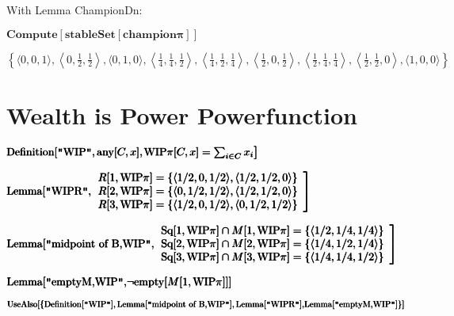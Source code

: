 \documentclass{article}
\begin{document}
With Lemma ChampionDn:

\noindent\(\pmb{\text{Compute}[\text{stableSet}[\text{champion$\pi $}]]}\)

\noindent\(\left\{\langle 0,0,1\rangle ,\left\langle 0,\frac{1}{2},\frac{1}{2}\right\rangle ,\langle 0,1,0\rangle ,\left\langle \frac{1}{4},\frac{1}{4},\frac{1}{2}\right\rangle
,\left\langle \frac{1}{4},\frac{1}{2},\frac{1}{4}\right\rangle ,\left\langle \frac{1}{2},0,\frac{1}{2}\right\rangle ,\left\langle \frac{1}{2},\frac{1}{4},\frac{1}{4}\right\rangle
,\left\langle \frac{1}{2},\frac{1}{2},0\right\rangle ,\langle 1,0,0\rangle \right\}\)

\section*{Wealth is Power Powerfunction}

\noindent\(\pmb{\text{Definition}[\text{$\texttt{"}$WIP$\texttt{"}$},\text{any}[C,x],}\\
\pmb{\left.\text{WIP$\pi $}[C,x]= \sum _{i\in C} x_i\right]}\)

\noindent\(\pmb{\text{Lemma}[\text{$\texttt{"}$WIPR$\texttt{"}$},}\\
\pmb{\left.
\begin{array}{c}
 R[1,\text{WIP$\pi $}]=\{\langle 1/2,0,1/2\rangle ,\langle 1/2,1/2,0\rangle \} \\
 R[2,\text{WIP$\pi $}]=\{\langle 0,1/2,1/2\rangle ,\langle 1/2,1/2,0\rangle \} \\
 R[3,\text{WIP$\pi $}]=\{\langle 1/2,0,1/2\rangle ,\langle 0,1/2,1/2\rangle \}
\end{array}
\right]}\)

\noindent\(\pmb{\text{Lemma}[\text{$\texttt{"}$midpoint of B,WIP$\texttt{"}$},}\\
\pmb{\left.
\begin{array}{c}
 \text{Sq}[1,\text{WIP$\pi $}]\cap M[1,\text{WIP$\pi $}]=\{\langle 1/2,1/4,1/4\rangle \} \\
 \text{Sq}[2,\text{WIP$\pi $}]\cap M[2,\text{WIP$\pi $}]=\{\langle 1/4,1/2,1/4\rangle \} \\
 \text{Sq}[3,\text{WIP$\pi $}]\cap M[3,\text{WIP$\pi $}]=\{\langle 1/4,1/4,1/2\rangle \}
\end{array}
\right]}\)

\noindent\(\pmb{\text{Lemma}[\text{$\texttt{"}$emptyM,WIP$\texttt{"}$},}\\
\pmb{\neg \text{empty}[M[1,\text{WIP$\pi $}]]]}\)

\noindent\(\pmb{\text{UseAlso}[\{\text{Definition}[\text{$\texttt{"}$WIP$\texttt{"}$}],\text{Lemma}[\text{$\texttt{"}$midpoint of B,WIP$\texttt{"}$}],\text{Lemma}[\text{$\texttt{"}$WIPR$\texttt{"}$}],}\\
\pmb{\text{Lemma}[\text{$\texttt{"}$emptyM,WIP$\texttt{"}$}]\}]}\)
\end{document}
